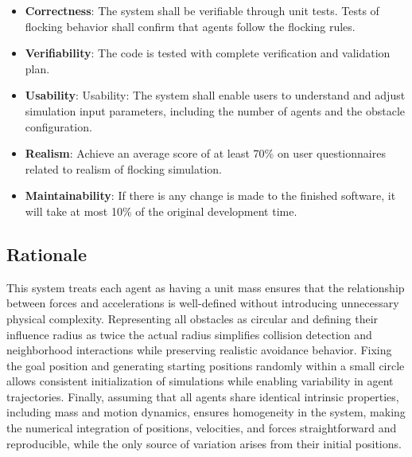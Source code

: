 \documentclass[12pt]{article}
\newcounter{nfrnum} %
\begin{document}
\noindent \begin{itemize}

\item[NFR\refstepcounter{nfrnum}\thenfrnum \label{NFR_Correctness}:]
\textbf{Correctness}: The system shall be verifiable through unit tests. 
Tests of flocking behavior shall confirm that agents follow the flocking rules.

\item[NFR\refstepcounter{nfrnum}\thenfrnum \label{NFR_Verifiability}:]
\textbf{Verifiability}: The code is tested with complete verification and 
validation plan.

\item[NFR\refstepcounter{nfrnum}\thenfrnum \label{NFR_Usability}:] 
\textbf{Usability}: Usability: The system shall enable users to understand and 
adjust simulation input parameters, including the number of agents and the 
obstacle configuration.

\item[NFR\refstepcounter{nfrnum}\thenfrnum \label{NFR_Realism}:] 
\textbf{Realism}: Achieve an average score of at least 70\% on user 
questionnaires related to realism of flocking simulation.

\item[NFR\refstepcounter{nfrnum}\thenfrnum \label{NFR_Maintainability}:]
\textbf{Maintainability}: If there is any change is made to the finished 
software, it will take at most 10\% of the original development time.

\end{itemize}

\subsection{Rationale}

This system treats each agent as having a unit mass ensures that the 
relationship between forces and accelerations is well-defined without 
introducing unnecessary physical complexity. Representing all obstacles as 
circular and defining their influence radius as twice the actual radius 
simplifies collision detection and neighborhood interactions while 
preserving realistic avoidance behavior. Fixing the goal position and 
generating starting positions randomly within a small circle allows consistent 
initialization of simulations while enabling variability in agent trajectories. 
Finally, assuming that all agents share identical intrinsic properties, 
including mass and motion dynamics, ensures homogeneity in the system, 
making the numerical integration of positions, velocities, and forces 
straightforward and reproducible, while the only source of variation arises 
from their initial positions.
\end{document}
